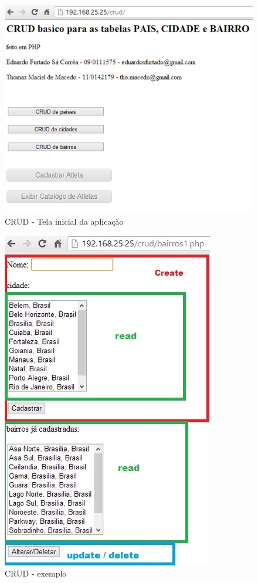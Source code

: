 \documentclass[10pt]{article}
\begin{document}
\begin{center}
\begin{figure}[h!]
\includegraphics[scale=0.5]{crud1.jpg}
\caption{CRUD - Tela inicial da aplicação}
\end{figure}
\end{center}


\begin{center}
\begin{figure}[h!]
\includegraphics[scale=0.7]{crud2-bairros.jpg}
\caption{CRUD - exemplo}
\end{figure}
\end{center}
\end{document}
